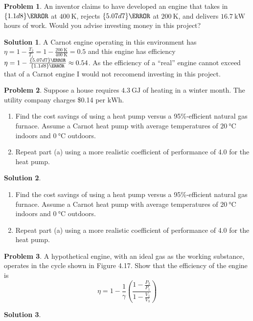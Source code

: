 \documentclass[10pt]{article}
\theoremstyle{definition}
\newtheorem{problem}{Problem}
\newtheorem{soln}{Solution}
\begin{document}
\begin{problem}
An inventor claims to have developed an engine that takes in $\qty{1.1d8}{\joule}$ at $\qty{400}{\kelvin}$,
rejects $\qty{5.07d7}{\joule}$ at $\qty{200}{\kelvin}$, and delivers $\qty{16.7}{\kilo\watt}$ hours of work.
Would you advise investing money in this project?
\end{problem}
\begin{soln}
  A Carnot engine operating in this environment has $\eta=1-\frac{T_2}{T_1}=1-\frac{\qty{200}{\kelvin}}{\qty{400}{\kelvin}}=0.5$ and this engine has efficiency
  $\eta=1-\frac{\qty{5.07d7}{\joule}}{\qty{1.1d8}{\joule}}\approx0.54$. As the efficiency of a ``real'' engine cannot exceed that of a Carnot engine I would not
  reccomend investing in this project.
\end{soln}

\begin{problem}
Suppose a house requires $\qty{4.3}{\giga\joule}$ of heating in a winter month. The
utility company charges \$0.14 per $\unit{\kilo\watt\hour}$.
\begin{enumerate}[label=(\alph*)]
  \item Find the cost savings of using a heat pump versus a 95\%-efficient natural gas furnace. Assume
        a Carnot heat pump with average temperatures of $\qty{20}{\degreeCelsius}$ indoors and $\qty{0}{\degreeCelsius}$ outdoors.
  \item Repeat part (a) using a more realistic coefficient of performance of 4.0 for the heat pump.
\end{enumerate}
\end{problem}
\begin{soln}
  \begin{enumerate}[label=(\alph*)]
    \item Find the cost savings of using a heat pump versus a 95\%-efficient natural gas furnace. Assume
          a Carnot heat pump with average temperatures of $\qty{20}{\degreeCelsius}$ indoors and $\qty{0}{\degreeCelsius}$ outdoors.
    \item Repeat part (a) using a more realistic coefficient of performance of 4.0 for the heat pump.
  \end{enumerate}
\end{soln}

\begin{problem}
A hypothetical engine, with an ideal gas as the working substance,
operates in the cycle shown in Figure 4.17. Show that the efficiency of
the engine is
$$\eta=1-\frac{1}{\gamma}\left(\frac{1-\frac{P_3}{P_1}}{1-\frac{V_1}{V_3}}\right)$$
\end{problem}
\begin{soln}
\end{soln}
\end{document}
